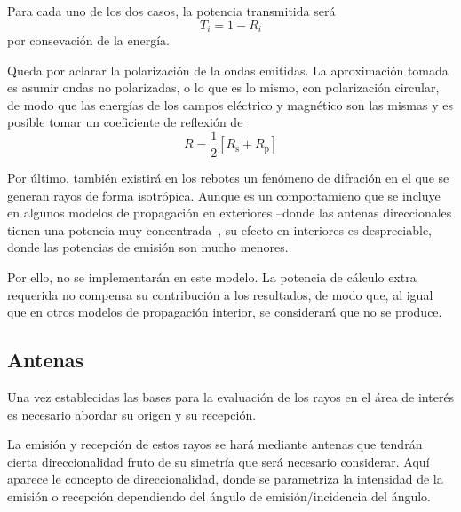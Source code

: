Para cada uno de los dos casos, la potencia transmitida será
\begin{equation}
    T_i = 1 - R_i
\end{equation}
por consevación de la energía.

Queda por aclarar la polarización de la ondas emitidas.
La aproximación tomada es asumir ondas no polarizadas, o lo que es lo mismo, con polarización circular, de modo que las energías de los campos eléctrico y magnético son las mismas y es posible tomar un coeficiente de reflexión de 
\begin{equation}
    R = \frac{1}{2} \left[ R_\mathrm{s} + R_\mathrm{p} \right]
\end{equation}

Por último, también existirá en los rebotes un fenómeno de difración en el que se generan rayos de forma isotrópica.
Aunque es un comportamieno que se incluye en algunos modelos de propagación en exteriores --donde las antenas direccionales tienen una potencia muy concentrada--, su efecto en interiores es despreciable, donde las potencias de emisión son mucho menores.

Por ello, no se implementarán en este modelo.
La potencia de cálculo extra requerida no compensa su contribución a los resultados, de modo que, al igual que en otros modelos de propagación interior, se considerará que no se produce.



\subsection{Antenas}

Una vez establecidas las bases para la evaluación de los rayos en el área de interés es necesario abordar su origen y su recepción.

La emisión y recepción de estos rayos se hará mediante antenas que tendrán cierta direccionalidad fruto de su simetría que será necesario considerar.
Aquí aparece le concepto de direccionalidad, donde se parametriza la intensidad de la emisión o recepción dependiendo del ángulo de emisión/incidencia del ángulo.\cite{Antennas}

